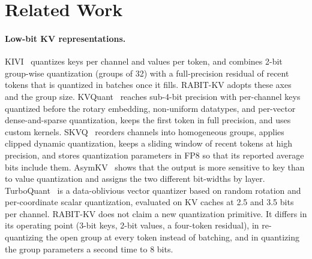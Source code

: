 \documentclass{article}
\begin{document}
\section{Related Work}
\label{sec:related}

\paragraph{Low-bit KV representations.}
KIVI~\citep{liu2024kivi} quantizes keys per channel and values per token, and combines 2-bit
group-wise quantization (groups of 32) with a full-precision residual of recent
tokens that is quantized in batches once it fills. RABIT-KV adopts these axes and the group size.
KVQuant~\citep{hooper2024kvquant} reaches sub-4-bit precision with per-channel keys quantized before
the rotary embedding, non-uniform datatypes, and per-vector dense-and-sparse quantization, keeps the
first token in full precision, and uses custom kernels. SKVQ~\citep{duanmu2024skvq} reorders channels
into homogeneous groups, applies clipped dynamic quantization, keeps a sliding window of recent tokens
at high precision, and stores quantization parameters in FP8 so that its reported average bits include
them. AsymKV~\citep{tao2024asymkv} shows that the output is more sensitive to key than to value
quantization and assigns the two different bit-widths by layer. TurboQuant~\citep{zandieh2025turboquant}
is a data-oblivious vector quantizer based on random rotation and per-coordinate scalar quantization,
evaluated on KV caches at 2.5 and 3.5 bits per channel. RABIT-KV does not claim a new
quantization primitive. It differs in its operating point (3-bit keys, 2-bit values, a four-token residual), in
re-quantizing the open group at every token instead of batching, and in quantizing the group parameters
a second time to 8 bits.
\end{document}

